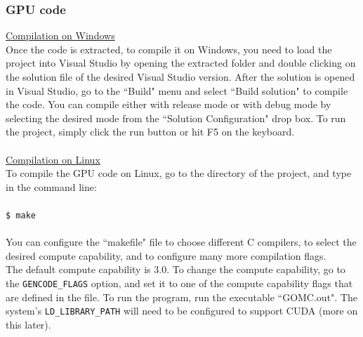 \subsubsection{GPU code}
\underline{Compilation on Windows}\\
Once the code is extracted, to compile it on Windows, you need to load the project into Visual Studio by opening the extracted folder and double clicking on the solution file of the desired Visual Studio version.  After the solution is opened in Visual Studio, go to the ``Build" menu and select ``Build solution" to compile the code. You can compile either with release mode or with debug mode by selecting the desired mode from the ``Solution Configuration" drop box. 
To run the project, simply click the run button or hit F5 on the keyboard.\\\\
\underline{Compilation on Linux}\\
To compile the GPU code on Linux, go to the directory of the project, and type in the command line:\\\\
\texttt{\$ make}\\\\
You can configure the ``makefile" file to choose different C compilers, to select the desired compute capability, and to configure many more compilation flags.\\
The default compute capability is 3.0. To change the compute capability, go to the \texttt{GENCODE\_FLAGS} option, and set it to one of the compute capability flags that are defined in the file.
To run the program, run the executable ``GOMC.out".  The system's \texttt{LD\_LIBRARY\_PATH} will need to be configured to support CUDA (more on this later).
